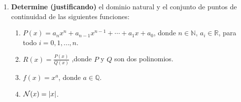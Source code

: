 \documentclass[12pt]{article}
\begin{document}
\begin{enumerate}
    \begin{proof}
        Solo se probará el primer límite, pues el segundo es análogo. Supongamos que $\cf{f,g}{S}{\mathbb{R}}$ donde $S\subseteq\mathbb{R}$. Sea $\left\{x_n \right\}_{ n=1}^\infty$ una sucesión en $S\backslash\left\{a \right\}$ que converge a $a$. Veamos que
        \begin{equation*}
            \begin{split}
                \lim_{ n\rightarrow\infty}\max(f,g)(x_n)&=\lim_{ n\rightarrow\infty}\left(\frac{f(x_n)+g(x_n)}{2}+\frac{\abs{f(x_n)-g(x_n)}}{2}\right)\\
                &=\lim_{ n\rightarrow\infty}\frac{f(x_n)+g(x_n)}{2}+\lim_{ n\rightarrow\infty}\frac{\abs{f(x_n)-g(x_n)}}{2}\\
                &=\frac{\lim_{ n\rightarrow\infty}[f(x_n)+g(x_n)]}{2}+\frac{\lim_{ n\rightarrow\infty}\abs{f(x_n)-g(x_n)}}{2}\\
                &=\frac{l+m}{2}+\frac{\abs{l-m}}{2}\\
                &=\max(l,m)\\
            \end{split}
        \end{equation*}
        por tanto, como la sucesión fue arbitraria, se sigue que
        \begin{equation*}
            \lim_{ x\rightarrow a}\max(f,g)(x)=\max(l,m)
        \end{equation*}
        lo que prueba el resultado.
    \end{proof}

    \item \textbf{Determine (justificando)} el dominio natural y el conjunto de puntos de continuidad de las siguientes funciones:
    \begin{enumerate}
        \item $P(x)=a_nx^n+a_{ n-1}x^{ n-1}+\cdots+a_1x+a_0$, donde $n\in\mathbb{N}$, $a_i\in\mathbb{R}$, para todo $i=0,1,...,n$.
        \item $R(x)=\frac{P(x)}{Q(x)}$ ,donde $P$ y $Q$ son dos polinomios.
        \item $f(x)=x^a$, donde $a\in\mathbb{Q}$.
        \item $\mathcal{N}(x)=\left| x \right|$.
    \end{enumerate}

    \begin{sol}
    \end{sol}


\end{enumerate}
\end{document}
